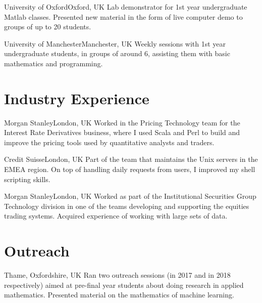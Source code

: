 \documentclass[10pt,a4paper,roman]{moderncv} %
\begin{document}
        {University of Oxford}{Oxford, UK}{}
        {
          Lab demonstrator for 1st year undergraduate Matlab classes.
          Presented new material in the form of live computer demo to groups
          of up to 20 students.
        }

        {University of Manchester}{Manchester, UK}{}
        {
          Weekly sessions with 1st year 
          undergraduate students, in groups of around 6,
          assisting them with basic mathematics and programming.
        }


\section{Industry Experience}

        {Morgan Stanley}{London, UK}{}
        {
          Worked in the Pricing Technology team for the Interest 
          Rate Derivatives business, where I used Scala and Perl 
          to build and improve the pricing tools used 
          by quantitative analysts and traders. 
        }

        {Credit Suisse}{London, UK}{}
        {
          Part of the team that maintains the Unix servers in the 
          EMEA region. On top of handling daily requests from users, 
          I improved my shell scripting skills.
        }

        {Morgan Stanley}{London, UK}{}
        {
          Worked as part of the Institutional Securities Group Technology 
          division in one of the teams developing and supporting the equities 
          trading systems. Acquired experience of working with large sets of data.
        }

\section{Outreach}

        {Thame, Oxfordshire, UK}{}{}
        {
          Ran two outreach sessions (in 2017 and in 2018 respectively) 
          aimed at pre-final year 
          students about doing research in applied mathematics.
          Presented material on the mathematics of machine learning.
        }
\end{document}
